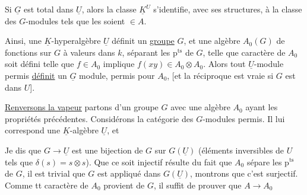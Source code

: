  Si $\underline G$ est total dans $\underline U$,  alors la classe $\underline K^{U}$ s'identifie,
avec  ses structures, à la classe des 
$G$-modules  tels que les  
 soient $\in A$.

Ainsi, une $\underline K$-hyperalgèbre $\underline U$ définit
un \uline{groupe} $G$, et une algèbre  $A_0(G)$ de fonctions
sur $G$ à valeurs dans $k$, séparant les $\mathrm{p}^{\mathrm{ts}}$ de $G$,
telle que  caractère  de $A_0$ soit défini
telle que $f\in A_0$ implique $f(xy)\in A_0\otimes A_0$. Alors
tout $\underline U$-module permis \uline{définit} un $\underline G$
module, permis pour $A_0$, [et la réciproque
est vraie si $G$ est   dans $U$].

\uline{Renversons la vapeur} partons d'un groupe
$G$ avec une algèbre $A_0$ ayant les propriétés
précédentes. Considérons la catégorie des
$G$-modules permis. Il lui correspond
une $\underline K$-algèbre $\underline U$, et

Je dis que $G\to\underline U$ est une bijection
de $G$ sur  $G(\underline U)$ (éléments inversibles
de $U$ tels que $\delta(s)=s\otimes s$). Que ce
soit injectif résulte du fait que $A_0$
sépare les $\mathrm p^{\mathrm{ts}}$ de $G$, il est trivial que $G$
est appliqué dans $G(\underline U)$,  montrons que
c'est surjectif. Comme tt caractère de $A_0$
provient de $G$, il suffit de prouver que $A\to A_0$

